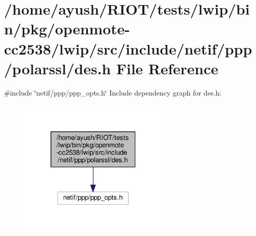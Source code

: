 \hypertarget{openmote-cc2538_2lwip_2src_2include_2netif_2ppp_2polarssl_2des_8h}{}\section{/home/ayush/\+R\+I\+O\+T/tests/lwip/bin/pkg/openmote-\/cc2538/lwip/src/include/netif/ppp/polarssl/des.h File Reference}
\label{openmote-cc2538_2lwip_2src_2include_2netif_2ppp_2polarssl_2des_8h}
{\ttfamily \#include \char`\"{}netif/ppp/ppp\+\_\+opts.\+h\char`\"{}}\newline
Include dependency graph for des.\+h\+:
\nopagebreak
\begin{figure}[H]
\begin{center}
\leavevmode
\includegraphics[width=205pt]{openmote-cc2538_2lwip_2src_2include_2netif_2ppp_2polarssl_2des_8h__incl}
\end{center}
\end{figure}
